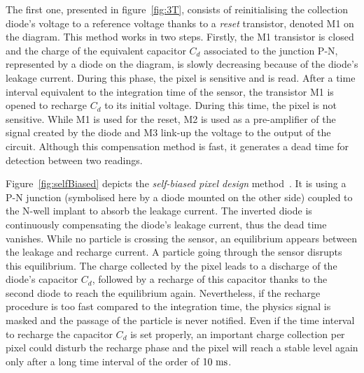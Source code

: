     The first one, presented in figure~\ref{fig:3T}, consists of reinitialising the collection diode's voltage to a reference voltage thanks to a \textit{reset} transistor, denoted M1 on the diagram.
    This method works in two steps. 
    Firstly, the M1 transistor is closed and the charge of the equivalent capacitor $C_d$ associated to the junction P-N, represented by a diode on the diagram, is slowly decreasing because of the diode's leakage current. 
    During this phase, the pixel is sensitive and is read.
    After a time interval equivalent to the integration time of the sensor, the transistor M1 is opened to recharge $C_d$ to its initial voltage.
    During this time, the pixel is not sensitive.
    While M1 is used for the reset, M2 is used as a pre-amplifier of the signal created by the diode and M3 link-up the voltage to the output of the circuit.
    Although this compensation method is fast, it generates a dead time for detection between two readings.
    
    Figure~\ref{fig:selfBiased} depicts the \textit{self-biased pixel design} method~\cite{Deveaux2009}.
    It is using a P-N junction (symbolised here by a diode mounted on the other side) coupled to the N-well implant to absorb the leakage current.
    The inverted diode is continuously compensating the diode's leakage current, thus the dead time vanishes.
    While no particle is crossing the sensor, an equilibrium appears between the leakage and recharge current.
    A particle going through the sensor disrupts this equilibrium.
    The charge collected by the pixel leads to a discharge of the diode's capacitor $C_d$, followed by a recharge of this capacitor thanks to the second diode to reach the equilibrium again.
    Nevertheless, if the recharge procedure is too fast compared to the integration time, the physics signal is masked and the passage of the particle is never notified.
    Even if the time interval to recharge the capacitor $C_d$ is set properly, an important charge collection per pixel could disturb the recharge phase and the pixel will reach a stable level again only after a long time interval of the order of $10~\rm{ms}$.

